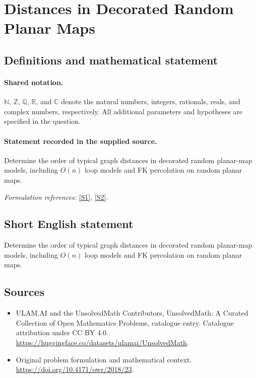 \documentclass[11pt]{article}
\newcommand{\sref}[2]{\hyperlink{source:#1:#2}{[S#2]}}
\begin{document}
\section{Distances in Decorated Random Planar Maps}\label{statement}

\subsection{Definitions and mathematical statement}

\paragraph{Shared notation.}$\mathbb N$, $\mathbb Z$, $\mathbb Q$, $\mathbb R$, and $\mathbb C$ denote the natural numbers, integers, rationals, reals, and complex numbers, respectively. All additional parameters and hypotheses are specified in the question.


\paragraph{Statement recorded in the supplied source.}
Determine the order of typical graph distances in decorated random planar-map models, including $O(n)$ loop models and FK percolation on random planar maps.
\par\smallskip\textit{Formulation references:} \sref{statement}{1}, \sref{statement}{2}.
\subsection{Short English statement}
Determine the order of typical graph distances in decorated random planar-map models, including $O(n)$ loop models and FK percolation on random planar maps.
\subsection{Sources}
\begin{itemize}
\item[\hypertarget{source:statement:1}{S1}] ULAM.AI and the UnsolvedMath Contributors, UnsolvedMath: A Curated Collection of Open Mathematics Problems, catalogue entry. Catalogue attribution under CC BY 4.0.
\url{https://huggingface.co/datasets/ulamai/UnsolvedMath}.
\item[\hypertarget{source:statement:2}{S2}] Original problem formulation and mathematical context.
\url{https://doi.org/10.4171/owr/2018/23}.
\end{itemize}
\label{end:statement}
\end{document}

